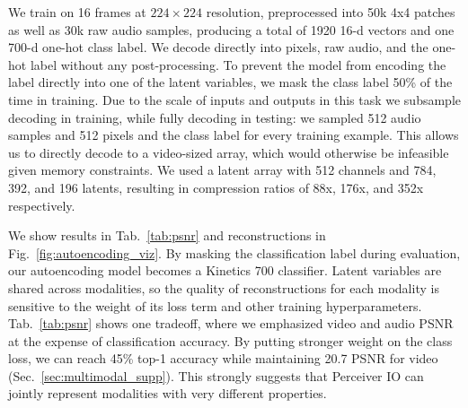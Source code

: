 \documentclass{article} %
\newcommand{\ourmodel}{Perceiver IO\xspace}
\begin{document}
We train on 16 frames at $224 \times 224$ resolution, preprocessed into 50k 4x4 patches as well as 30k raw audio samples, producing a total of 1920 16-d vectors and one 700-d one-hot class label. We decode directly into pixels, raw audio, and the one-hot label without any post-processing.
To prevent the model from encoding the label directly into one of the latent variables, we mask the class label 50\% of the time in training. Due to the scale of inputs and outputs in this task we subsample decoding in training, while fully decoding in testing: we sampled 512 audio samples and 512 pixels and the class label for every training example. This allows us to directly decode to a video-sized array, which would otherwise be infeasible given memory constraints. We used a latent array with 512 channels and 784, 392, and 196 latents, resulting in compression ratios of 88x, 176x, and 352x respectively. 

\begin{table}
        \centering
    \caption{\small Multimodal autoencoding results. Higher is better for accuracy and PSNR.}
    \label{tab:psnr}
    \vspace{-10pt}
\end{table}

We show results in Tab.~\ref{tab:psnr} and reconstructions in Fig.~\ref{fig:autoencoding_viz}.
By masking the classification label during evaluation, our autoencoding model becomes a Kinetics 700 classifier. Latent variables are shared across modalities, so the quality of reconstructions for each modality is sensitive to the weight of its loss term and other training hyperparameters.
Tab.~\ref{tab:psnr} shows one tradeoff, where we emphasized video and audio PSNR
at the expense of classification accuracy.
By putting stronger weight on the class loss,
we can reach 45\% top-1 accuracy while maintaining 20.7 PSNR for video (Sec.~\ref{sec:multimodal_supp}). This strongly suggests that \ourmodel{} can jointly represent modalities with very different properties. 
\end{document}
